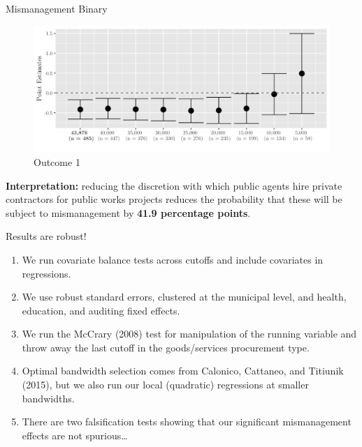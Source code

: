 \documentclass[10pt,ignorenonframetext,]{beamer}
\begin{document}
\begin{frame}{Mismanagement Binary}
\protect\hypertarget{mismanagement-binary}{}

\begin{figure}
\centering
\includegraphics{./images/mismanagementplot1.png}
\caption{Outcome 1}
\end{figure}

\textbf{Interpretation:} reducing the discretion with which public
agents hire private contractors for public works projects reduces the
probability that these will be subject to mismanagement by \textbf{41.9
percentage points}.

\end{frame}

\begin{frame}{Results are robust!}
\protect\hypertarget{results-are-robust}{}

\begin{enumerate}
\item
  We run covariate balance tests across cutoffs and include covariates
  in regressions.
\item
  We use robust standard errors, clustered at the municipal level, and
  health, education, and auditing fixed effects.
\item
  We run the McCrary (2008) test for manipulation of the running
  variable and throw away the last cutoff in the goods/services
  procurement type.
\item
  Optimal bandwidth selection comes from Calonico, Cattaneo, and
  Titiunik (2015), but we also run our local (quadratic) regressions at
  smaller bandwidths.
\item
  There are two falsification tests showing that our significant
  mismanagement effects are not spurious\ldots{}
\end{enumerate}

\end{frame}
\end{document}
